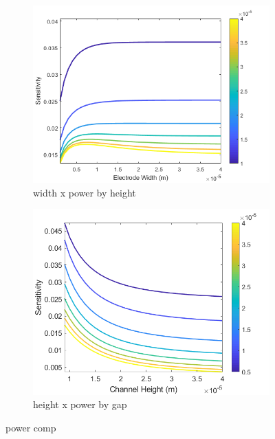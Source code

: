 \begin{figure}[h]
    \begin{subfigure}[b]{0.49\textwidth}
        \centering
        \includegraphics[width=\textwidth]{images/analytic_widthXpowerByHeight.png}
        \caption{width x power by height}
    \end{subfigure}
    \hfill
    \begin{subfigure}[b]{0.49\textwidth}
        \centering
        \includegraphics[width=\textwidth]{images/analytic_heightXpowerByGap.png}
        \caption{height x power by gap}
    \end{subfigure}
    \caption[power comp]{power comp}
    \label{fig:analytic_sensitivity}
\end{figure}



